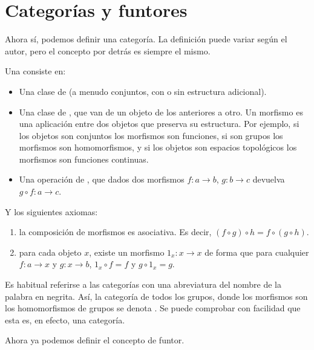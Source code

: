 \section{Categorías y funtores}

Ahora sí, podemos definir una categoría. La definición puede variar según el autor, pero el concepto por detrás es siempre el mismo.

\begin{defi}[Categoría]
\label{funt_defi_categoria}

Una  consiste en:

\begin{itemize}
\item Una clase de  (a menudo conjuntos, con o sin estructura adicional).
\item Una clase de , que van de un objeto de los anteriores a otro. Un morfismo es una aplicación entre dos objetos que preserva su estructura. Por ejemplo, si los objetos son conjuntos los morfismos son funciones, si son grupos los morfismos son homomorfismos, y si los objetos son espacios topológicos los morfismos son funciones continuas.
\item Una operación de , que dados dos morfismos $f:a\to b$, $g:b\to c$ devuelva $g\circ f:a\to c$.
\end{itemize}

Y los siguientes axiomas:
\begin{enumerate}[label=\Roman*]
\item {} la composición de morfismos es asociativa. Es decir, $(f\circ g)\circ h=f\circ(g\circ h)$.
\item {} para cada objeto $x$, existe un morfismo $1_x:x\to x$ de forma que para cualquier $f:a\to x$ y $g:x\to b$, $1_x\circ f=f$ y $g\circ 1_x=g$.
\end{enumerate}
\end{defi}

\begin{obs}
	Es habitual referirse a las categorías con una abreviatura del nombre de la palabra en negrita. Así, la categoría de todos los grupos, donde los morfismos son los homomorfismos de grupos se denota \Grp. Se puede comprobar con facilidad que esta es, en efecto, una categoría.
\end{obs}

Ahora ya podemos definir el concepto de funtor.

